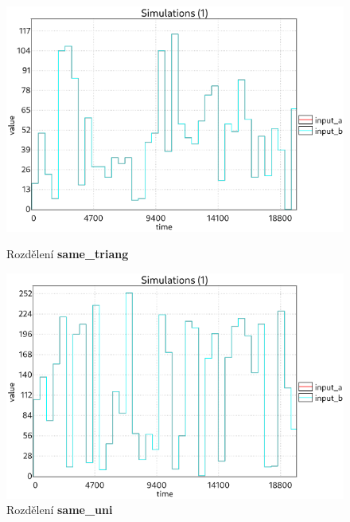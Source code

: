\begin{figure}[H]
\centering
\begin{minipage}{.5\textwidth}
  \centering
  \includegraphics[width=0.95\linewidth]{obrazky-figures/inputs_same_triang.png}
  \caption{Rozdělení \textbf{same\_triang}}
  \label{fig:inputs_const_norm}
\end{minipage}%
\begin{minipage}{.5\textwidth}
  \centering
  \includegraphics[width=0.95\linewidth]{obrazky-figures/inputs_same_uni.png}
  \caption{Rozdělení \textbf{same\_uni}}
  \label{fig:inputs_same_uni}
\end{minipage}
\end{figure}

